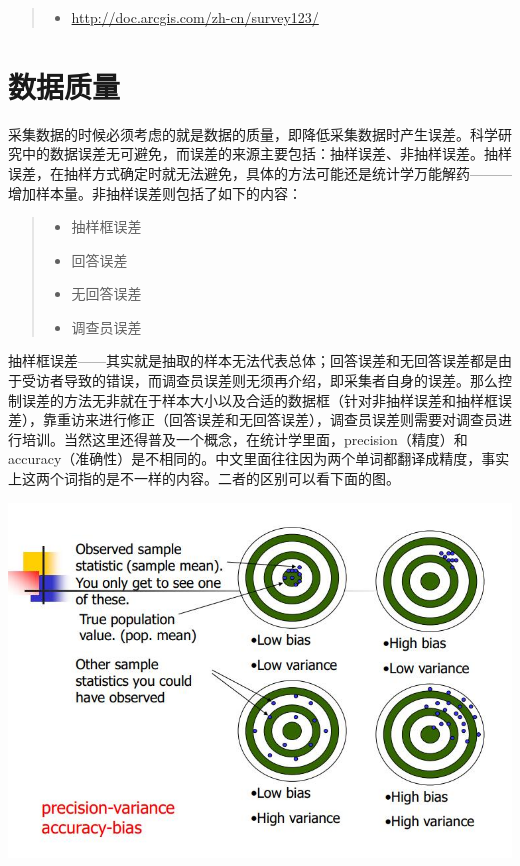 \documentclass[]{ctexbook}
\providecommand{\tightlist}{%
  \setlength{\itemsep}{0pt}\setlength{\parskip}{0pt}}
\begin{document}
\begin{quote}
\begin{itemize}
\tightlist
\item
  \url{http://doc.arcgis.com/zh-cn/survey123/}
\end{itemize}
\end{quote}

\hypertarget{ux6570ux636eux8d28ux91cf}{%
\section{数据质量}\label{ux6570ux636eux8d28ux91cf}}

采集数据的时候必须考虑的就是数据的质量，即降低采集数据时产生误差。科学研究中的数据误差无可避免，而误差的来源主要包括：抽样误差、非抽样误差。抽样误差，在抽样方式确定时就无法避免，具体的方法可能还是统计学万能解药---------增加样本量。非抽样误差则包括了如下的内容：

\begin{quote}
\begin{itemize}
\tightlist
\item
  抽样框误差
\item
  回答误差
\item
  无回答误差
\item
  调查员误差
\end{itemize}
\end{quote}

抽样框误差------其实就是抽取的样本无法代表总体；回答误差和无回答误差都是由于受访者导致的错误，而调查员误差则无须再介绍，即采集者自身的误差。那么控制误差的方法无非就在于样本大小以及合适的数据框（针对非抽样误差和抽样框误差），靠重访来进行修正（回答误差和无回答误差），调查员误差则需要对调查员进行培训。当然这里还得普及一个概念，在统计学里面，precision（精度）和accuracy（准确性）是不相同的。中文里面往往因为两个单词都翻译成精度，事实上这两个词指的是不一样的内容。二者的区别可以看下面的图。

\includegraphics[width=1\linewidth,height=0.5\textheight]{fig/fig6}
\end{document}
